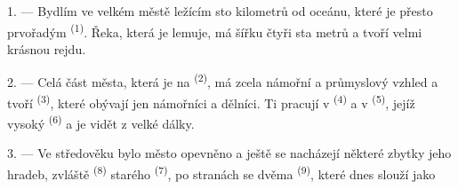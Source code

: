 %
%
%

\VUsaut{2.0mm}
\VUsaut{3.0mm}
\VUfilet{16mm}
\VUsaut{5.6mm}
\VUsaut{1.4mm}
\VUsaut{2.2mm}

\VUsaut{3.0mm}

1. --- Bydlím ve velkém městě ležícím sto kilometrů od oceánu, které je přesto
prvořadým  \textsuperscript{(1)}. Řeka, která je lemuje, má šířku
čtyři sta metrů a tvoří velmi krásnou rejdu.

2. --- Celá část města, která je na  \textsuperscript{(2)}, má zcela
námořní a průmyslový vzhled a tvoří  \textsuperscript{(3)}, které
obývají jen námořníci a dělníci. Ti pracují v 
\textsuperscript{(4)} a v  \textsuperscript{(5)}, jejíž vysoký
 \textsuperscript{(6)} a  je vidět z velké dálky.

3. --- Ve středověku bylo město opevněno a ještě se nacházejí některé zbytky jeho
hradeb, zvláště  \textsuperscript{(8)} starého 
\textsuperscript{(7)}, po stranách se dvěma  \textsuperscript{(9)},
které dnes slouží jako 

